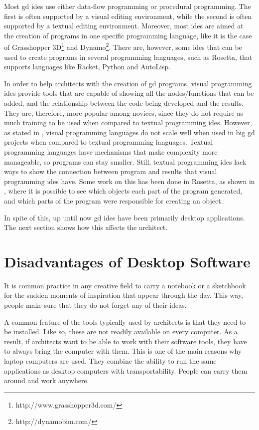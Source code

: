 Most \gls{gd} \glspl{ide} use either data-flow programming or procedural programming.
The first is often supported by a visual editing environment, while the second is often supported by a textual editing environment.
Moreover, most \glspl{ide} are aimed at the creation of programs in one specific programming language, like it is the case of Grasshopper 3D\footnote{http://www.grasshopper3d.com/} and Dynamo\footnote{http://dynamobim.com/}.
There are, however, some \glspl{ide} that can be used to create programs in several programming languages, such as Rosetta\cite{de2012modern}, that supports languages like Racket, Python and AutoLisp.

In order to help architects with the creation of \gls{gd} programs, visual programming \glspl{ide} provide tools that are capable of showing all the nodes/functions that can be added, and the relationship between the code being developed and the results.
They are, therefore, more popular among novices, since they do not require as much training to be used when compared to textual programming \glspl{ide}.
However, as stated in \cite{leitao2012programming}, visual programming languages do not scale well when used in big \gls{gd} projects when compared to textual programming languages.
Textual programming languages have mechanisms that make complexity more manageable, so programs can stay smaller.
Still, textual programming \glspl{ide} lack ways to show the connection between program and results that visual programming \glspl{ide} have.
Some work on this has been done in Rosetta, as shown in \cite{de2012modern}, where it is possible to see which objects each part of the program generated, and which parts of the program were responsible for creating an object.

In spite of this, up until now \gls{gd} \glspl{ide} have been primarily desktop applications.
The next section shows how this affects the architect.


\section{Disadvantages of Desktop Software}
It is common practice in any creative field to carry a notebook or a sketchbook for the sudden moments of inspiration that appear through the day.
This way, people make sure that they do not forget any of their ideas.

A common feature of the tools typically used by architects is that they need to be installed.
Like so, these are not readily available on every computer.
As a result, if architects want to be able to work with their software tools, they have to always bring the computer with them.
This is one of the main reasons why laptop computers are used.
They combine the ability to run the same applications as desktop computers with transportability.
People can carry them around and work anywhere.

